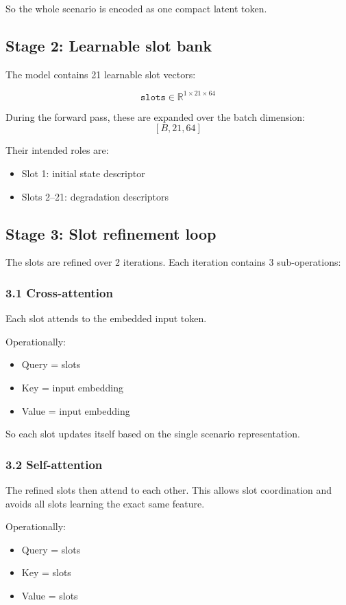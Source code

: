 \documentclass[11pt,a4paper]{article}
\begin{document}
So the whole scenario is encoded as one compact latent token.

\subsection*{Stage 2: Learnable slot bank}
The model contains 21 learnable slot vectors:

$$
\texttt{slots} \in \mathbb{R}^{1 \times 21 \times 64}
$$

During the forward pass, these are expanded over the batch dimension:
$$
[B, 21, 64]
$$

Their intended roles are:
\begin{itemize}[nosep]
    \item Slot 1: initial state descriptor
    \item Slots 2--21: degradation descriptors
\end{itemize}

\subsection*{Stage 3: Slot refinement loop}
The slots are refined over 2 iterations. Each iteration contains 3 sub-operations:

\subsubsection*{3.1 Cross-attention}
Each slot attends to the embedded input token.

Operationally:
\begin{itemize}[nosep]
    \item Query = slots
    \item Key = input embedding
    \item Value = input embedding
\end{itemize}

So each slot updates itself based on the single scenario representation.

\subsubsection*{3.2 Self-attention}
The refined slots then attend to each other. This allows slot coordination and avoids all slots learning the exact same feature.

Operationally:
\begin{itemize}[nosep]
    \item Query = slots
    \item Key = slots
    \item Value = slots
\end{itemize}
\end{document}

